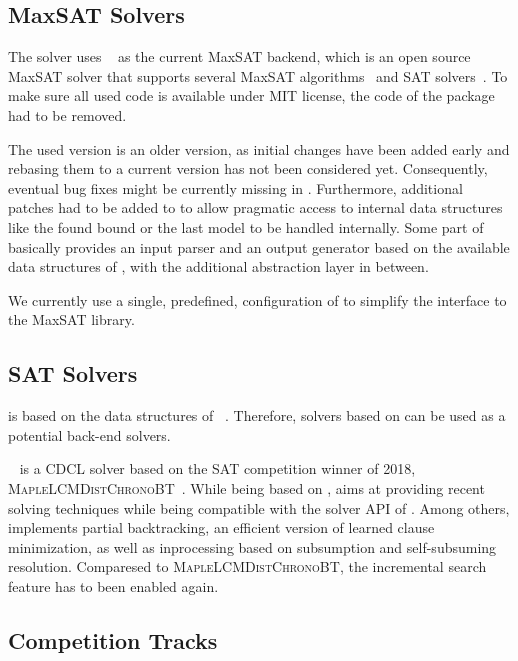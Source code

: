 \documentclass[conference]{IEEEtran}
\begin{document}
\subsection{MaxSAT Solvers}

The solver uses \openwbo~\cite{martins-sat14} as the current MaxSAT backend, which is an open source MaxSAT solver that supports several MaxSAT algorithms~\cite{manquinho-sat09,wmsu3-corr07,martins-cp14,martins-ecai12,martins-sat13,morgado-cp14,neves-sat15} and SAT solvers~\cite{minisat-sat03,audemard-ijcai09,mergesat}.
To make sure all used code is available under MIT license, the \glucose code of the \openwbo package had to be removed.

The used \openwbo version is an older version, as initial changes have been added early and rebasing them to a current version has not been considered yet.
Consequently, eventual bug fixes might be currently missing in \smax.
Furthermore, additional patches had to be added to \openwbo to allow pragmatic access to internal data structures like the found bound or the last model to be handled internally.
Some part of \smax basically provides an input parser and an output generator based on the available data structures of \openwbo, with the additional abstraction layer in between.

We currently use a single, predefined, configuration of \openwbo to simplify the interface to the MaxSAT library.

\subsection{SAT Solvers}

\openwbo is based on the data structures of \minisat~\cite{minisat-sat03,MiniSat:github}.
Therefore, solvers based on \minisat can be used as a potential back-end solvers.

\mergesat~\cite{mergesat} is a CDCL solver based on the SAT competition winner of 2018, \textsc{MapleLCMDistChronoBT}~\cite{chronobt}.
While being based on \minisat, \mergesat aims at providing recent solving techniques while being compatible with the solver API of \minisat.
Among others, \mergesat implements partial backtracking, an efficient version of learned clause minimization, as well as inprocessing based on subsumption and self-subsuming resolution.
Comparesed to \textsc{MapleLCMDistChronoBT}, the incremental search feature has to been enabled again.

\subsection{Competition Tracks}
\end{document}
